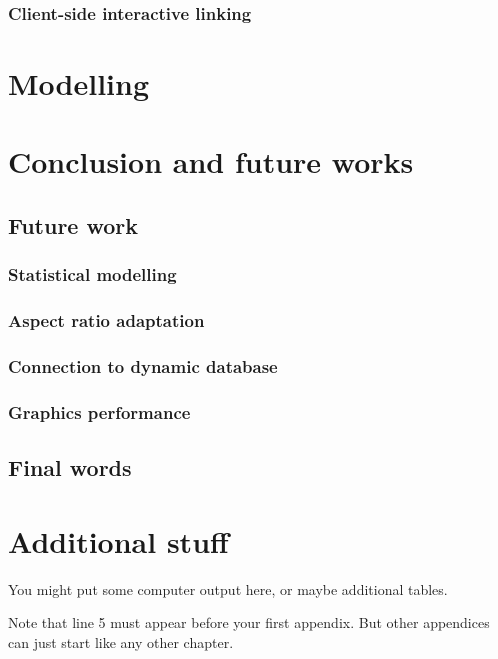 \documentclass{aucklandthesis}
\begin{document}
\hypertarget{client-side-interactive-linking}{%
\subsection{Client-side interactive linking}\label{client-side-interactive-linking}}

\hypertarget{ch:model}{%
\chapter{Modelling}\label{ch:model}}

\hypertarget{ch:conclusion}{%
\chapter{Conclusion and future works}\label{ch:conclusion}}

\hypertarget{future-work}{%
\section{Future work}\label{future-work}}

\hypertarget{statistical-modelling}{%
\subsection{Statistical modelling}\label{statistical-modelling}}

\hypertarget{aspect-ratio-adaptation}{%
\subsection{Aspect ratio adaptation}\label{aspect-ratio-adaptation}}

\hypertarget{connection-to-dynamic-database}{%
\subsection{Connection to dynamic database}\label{connection-to-dynamic-database}}

\hypertarget{graphics-performance}{%
\subsection{Graphics performance}\label{graphics-performance}}

\hypertarget{final-words}{%
\section{Final words}\label{final-words}}

\appendix

\hypertarget{additional-stuff}{%
\chapter{Additional stuff}\label{additional-stuff}}

You might put some computer output here, or maybe additional tables.

Note that line 5 must appear before your first appendix. But other appendices can just start like any other chapter.

\printbibliography[heading=bibintoc]
\end{document}
